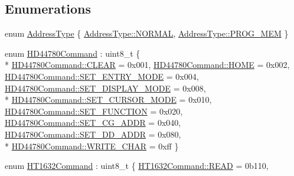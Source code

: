\subsection*{Enumerations}
\begin{DoxyCompactItemize}
\item 
enum \hyperlink{namespaceflame_a62698923ce7cbb06514750e7f0651c7f}{Address\-Type} \{ \hyperlink{namespaceflame_a62698923ce7cbb06514750e7f0651c7fa1e23852820b9154316c7c06e2b7ba051}{Address\-Type\-::\-N\-O\-R\-M\-A\-L}, 
\hyperlink{namespaceflame_a62698923ce7cbb06514750e7f0651c7fab65ac8cee0e0726efd689707838b2143}{Address\-Type\-::\-P\-R\-O\-G\-\_\-\-M\-E\-M}
 \}
\item 
enum \hyperlink{namespaceflame_ad814bac19b0569ff480de071076a23e9}{H\-D44780\-Command} \-: uint8\-\_\-t \{ \\*
\hyperlink{namespaceflame_ad814bac19b0569ff480de071076a23e9a813461e0c58e7ad59a2fd83ca2237fec}{H\-D44780\-Command\-::\-C\-L\-E\-A\-R} = 0x001, 
\hyperlink{namespaceflame_ad814bac19b0569ff480de071076a23e9a710533dd879dd1202e5c73b27705bf02}{H\-D44780\-Command\-::\-H\-O\-M\-E} = 0x002, 
\hyperlink{namespaceflame_ad814bac19b0569ff480de071076a23e9a9a714ca9aec744e422a3628adfdf723f}{H\-D44780\-Command\-::\-S\-E\-T\-\_\-\-E\-N\-T\-R\-Y\-\_\-\-M\-O\-D\-E} = 0x004, 
\hyperlink{namespaceflame_ad814bac19b0569ff480de071076a23e9a18f26a7e69e5948525ac7a8d169fb95a}{H\-D44780\-Command\-::\-S\-E\-T\-\_\-\-D\-I\-S\-P\-L\-A\-Y\-\_\-\-M\-O\-D\-E} = 0x008, 
\\*
\hyperlink{namespaceflame_ad814bac19b0569ff480de071076a23e9a90d257a6b55c297e177671dd8c31ea75}{H\-D44780\-Command\-::\-S\-E\-T\-\_\-\-C\-U\-R\-S\-O\-R\-\_\-\-M\-O\-D\-E} = 0x010, 
\hyperlink{namespaceflame_ad814bac19b0569ff480de071076a23e9a8404a3c3633db98ac55c2564c4ec92bf}{H\-D44780\-Command\-::\-S\-E\-T\-\_\-\-F\-U\-N\-C\-T\-I\-O\-N} = 0x020, 
\hyperlink{namespaceflame_ad814bac19b0569ff480de071076a23e9a576c325fc079d9b812944f1d046d694a}{H\-D44780\-Command\-::\-S\-E\-T\-\_\-\-C\-G\-\_\-\-A\-D\-D\-R} = 0x040, 
\hyperlink{namespaceflame_ad814bac19b0569ff480de071076a23e9aca846c55755637b4bed7288d9d2f1d90}{H\-D44780\-Command\-::\-S\-E\-T\-\_\-\-D\-D\-\_\-\-A\-D\-D\-R} = 0x080, 
\\*
\hyperlink{namespaceflame_ad814bac19b0569ff480de071076a23e9a65b6de8c947ca7db0fc8479a23d3d49f}{H\-D44780\-Command\-::\-W\-R\-I\-T\-E\-\_\-\-C\-H\-A\-R} = 0xff
 \}
\item 
enum \hyperlink{namespaceflame_a91bc10f291a609106b7c645e4f4ba251}{H\-T1632\-Command} \-: uint8\-\_\-t \{ \hyperlink{namespaceflame_a91bc10f291a609106b7c645e4f4ba251a3466fab4975481651940ed328aa990e4}{H\-T1632\-Command\-::\-R\-E\-A\-D} = 0b110, 

\end{DoxyCompactItemize}
